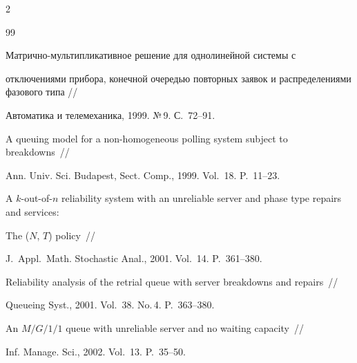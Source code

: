 \begin{multicols}{2}
{{\begin{thebibliography}{99}




Матрично-мультипликативное решение для однолинейной системы с


отключениями прибора, конечной очередью повторных заявок и распределениями фазового типа //


Автоматика и телемеханика, 1999. №\,9. С.~72--91.









A queuing model for a non-homogeneous polling system subject to breakdowns~//


Ann. Univ. Sci. Budapest, Sect. Comp., 1999. Vol.~18. P.~11--23.









A $k$-out-of-$n$ reliability system with an unreliable server and phase type repairs and services: 


The ($N$, $T$) policy~//


J.\ Appl.\ Math. Stochastic Anal., 2001. Vol.~14. P.~361--380.









Reliability analysis of the retrial queue with server breakdowns and repairs~//


Queueing Syst., 2001. Vol.~38. No.\,4. P.~363--380.












An $M/G/1/1$ queue with unreliable server and no waiting capacity~//


Inf. Manage. Sci., 2002. Vol.~13. P.~35--50.








\end{thebibliography}}}
\end{multicols}
